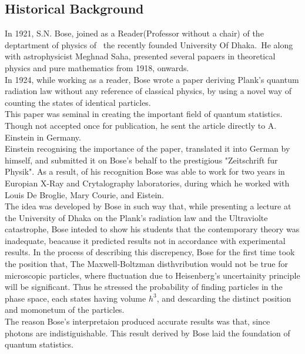 \documentclass[12pt, letterpaper]{article}
\begin{document}
    
    
    \subsection*{Historical Background}

    In 1921, S.N. Bose, joined as a Reader(Professor without a chair) of the deptartment of physics of \ the recently founded University Of Dhaka.\
    He along with astrophysicist Meghnad Saha, presented several papaers in theoretical physics and pure mathematics from 1918, onwards.\\

    In 1924, while working as a reader, Bose  wrote a paper deriving Plank's quantum radiation law without any reference of classical 
    physics, by using a novel way of counting the states of identical particles. \\ 
    This paper was seminal in creating the important field of quantum statistics. Though not accepted once
    for publication, he sent the article directly to A. Einstein in Germany. \\

    Einstein recognising the importance of the paper, translated it into German by himself, and submitted it on Bose's behalf to the 
    prestigious "Zeitschrift fur Physik". As a result, of his recognition Bose was able to work for two years in Europian X-Ray and 
    Crytalography laboratories, during which he worked with Louis De Broglie, Mary Courie, and Eistein.\\
    
    The idea was developed by Bose in such way that, while presenting a lecture at the University of Dhaka on the Plank's radiation law
    and the Ultraviolte catastrophe, Bose inteded to show his students that the contemporary theory was inadequate, beacause it predicted
    results not in accordance with experimental results. In the process of describing this discrepency, Bose for the first time took 
    the position that, The Maxwell-Boltzman disthvribution would not be true for microscopic particles, where fluctuation due to 
    Heisenberg's uncertainity principle will be significant. Thus he stressed the probability of finding particles in the phase space,
    each states having volume $h^{3}$, and descarding the distinct position and momonetum of the particles. \\
    
    The reason Bose's interpretaion produced accurate results was that, since photons are indistiguishable. This result derived by Bose 
    laid the foundation of quantum statistics. \\ 
\end{document}
